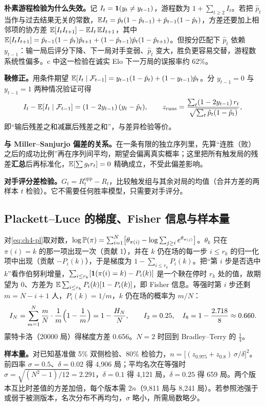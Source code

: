 \textbf{朴素游程检验为什么失效。}记 $I_t=\mathbf{1}(y_t\ne y_{t-1})$，游程数为 $1+\sum_{t\ge2}I_t$。若把 $\hat p_t$ 当作与过去结果无关的常数，$\mathbb{E} I_t=\hat p_t(1-\hat p_{t-1})+\hat p_{t-1}(1-\hat p_t)$，方差还要加上相邻项的协方差 $\mathbb{E}[I_tI_{t+1}]-\mathbb{E} I_t\,\mathbb{E} I_{t+1}$，其中 $\mathbb{E}[I_tI_{t+1}]=\hat p_{t-1}(1-\hat p_t)\hat p_{t+1}+(1-\hat p_{t-1})\hat p_t(1-\hat p_{t+1})$。但按分匹配下 $\hat p_t$ 依赖 $y_{t-1}$：输一局后评分下降、下一局对手变弱、$\hat p_t$ 变大，胜负更容易交替，游程数系统性偏多。c 中这一检验在诚实 Elo 下一万局的误报率约 62\%。

\textbf{鞅修正。}用条件期望 $\mathbb{E}[I_t\mid\mathcal F_{t-1}]=y_{t-1}(1-\hat p_t)+(1-y_{t-1})\hat p_t$。分 $y_{t-1}=0$ 与 $y_{t-1}=1$ 两种情况验证可得
\[
I_t-\mathbb{E}[I_t\mid\mathcal F_{t-1}]=(1-2y_{t-1})\,(y_t-\hat p_t),\qquad
z_{\mathrm{runs}}=\frac{\sum_t(1-2y_{t-1})\,r_t}{\sqrt{\sum_t\hat p_t(1-\hat p_t)}},
\]
即“输后残差之和减赢后残差之和”，与差异检验等价。

\textbf{与 Miller–Sanjurjo 偏差的关系。}在一条有限的独立序列里，先算“连胜（败）之后的成功比例”再在序列间平均，期望会偏离真实概率\cite{miller2018surprised}；这里把所有触发局的残差\textbf{汇总}后再标准化，$\mathbb{E}[\sum g_tr_t]=0$ 精确成立，不受此偏差影响。

\textbf{对手评分差检验。}$G_t=R^{\mathrm{opp}}_t-R_t$，比较触发组与其余对局的均值（合并方差的两样本 $t$ 检验）。它不需要任何胜率模型，只需要对手评分。

\subsection{Plackett–Luce 的梯度、Fisher 信息与样本量}
\label{app:ch4-pl}

对\cref{eq:ch4-pl}取对数，$\log\mathbb{P}(\pi)=\sum_{i=1}^{N}\bigl[\theta_{\pi(i)}-\log\sum_{j\ge i}e^{\theta_{\pi(j)}}\bigr]$。$\theta_k$ 只在 $\pi(i)=k$ 的那一项出现一次（贡献 1），并在 $k$ 仍在场的每一步 $i\le r_k$ 的归一化项中出现（贡献 $-P_i(k)$），于是梯度为 $1-\sum_{i\le r_k}P_i(k)$。把“第 $i$ 步是否选中 $k$”看作伯努利增量，$\sum_{i\le r_k}[\mathbf{1}(\pi(i)=k)-P_i(k)]$ 是一个鞅在停时 $r_k$ 处的值，故期望为 0、方差为 $\mathbb{E}\sum_{i\le r_k}P_i(k)[1-P_i(k)]$，即 Fisher 信息。等强时第 $i$ 步还剩 $m=N-i+1$ 人，$P_i(k)=1/m$，$k$ 仍在场的概率为 $m/N$：
\[
I_N=\sum_{m=1}^{N}\frac{m}{N}\cdot\frac1m\Bigl(1-\frac1m\Bigr)=1-\frac{H_N}{N},\qquad I_2=0.25,\quad I_8=1-\frac{2.718}{8}\approx0.660.
\]
蒙特卡洛（20000 局）得梯度方差 0.656。$N=2$ 时回到 Bradley–Terry 的 $\tfrac14$。

\textbf{样本量。}对已知基准做 5\% 双侧检验、80\% 检验力，$n=\bigl[(z_{0.975}+z_{0.8})\,\sigma/\delta\bigr]^2$。前四率 $\sigma=0.5$、$\delta=0.02$ 得 4,906 局；平均名次在等强时 $\sigma=\sqrt{(N^2-1)/12}=2.291$，$\delta=0.1$ 得 4,121 局，$\delta=0.25$ 得 659 局。两个版本互比时差值的方差加倍，每个版本需 $2n$（9,811 局与 8,241 局）。若参照池强于或弱于被测版本，名次分布不再均匀，$\sigma$ 略小，所需局数略少。

